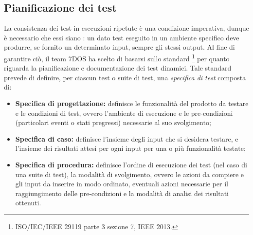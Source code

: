 \subsection{Pianificazione dei test}
La consistenza dei test in esecuzioni ripetute è una condizione imperativa, dunque è necessario che essi siano : un dato test eseguito in un ambiente specifico deve produrre, se fornito un determinato input, sempre gli stessi output. Al fine di garantire ciò, il team 7DOS ha scelto di basarsi sullo standard \footnote{ISO/IEC/IEEE 29119 parte 3 sezione 7, IEEE 2013.} per quanto riguarda la pianificazione e documentazione dei test dinamici. Tale standard prevede di definire, per ciascun test o suite di test, una \emph{specifica di test} composta di:
\begin{itemize}
	\item {\textbf{Specifica di progettazione:} definisce le funzionalità del prodotto da testare e le condizioni di test, ovvero l'ambiente di esecuzione e le pre-condizioni (particolari eventi o stati pregressi) necessarie al suo svolgimento;}
	\item {\textbf{Specifica di caso:} definisce l'insieme degli input che si desidera testare, e l'insieme dei risultati attesi per ogni input per una o più funzionalità testate;}
	\item {\textbf{Specifica di procedura:} definisce l'ordine di esecuzione dei test (nel caso di una suite di test), la modalità di svolgimento, ovvero le azioni da compiere e gli input da inserire in modo ordinato, eventuali azioni necessarie per il raggiungimento delle pre-condizioni e la modalità di analisi dei risultati ottenuti.}
\end{itemize}

